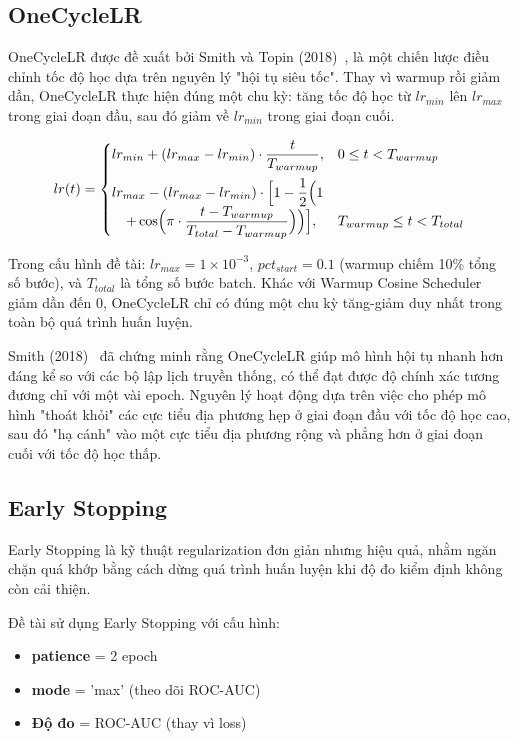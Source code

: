 \documentclass[../BTL.tex]{subfiles}
\begin{document}
\subsection{OneCycleLR}
OneCycleLR được đề xuất bởi Smith và Topin (2018)~\cite{smith2018superconvergence}, là một chiến lược điều chỉnh tốc độ học dựa trên nguyên lý "hội tụ siêu tốc". Thay vì warmup rồi giảm dần, OneCycleLR thực hiện đúng một chu kỳ: tăng tốc độ học từ $lr_{min}$ lên $lr_{max}$ trong giai đoạn đầu, sau đó giảm về $lr_{min}$ trong giai đoạn cuối.

\begin{equation}
    lr(t) =
    \begin{cases}
        lr_{min} + (lr_{max} - lr_{min}) \cdot \dfrac{t}{T_{warmup}}, & 0 \leq t < T_{warmup} \\[1em]
        lr_{max} - (lr_{max} - lr_{min}) \cdot \Bigl[1 - \dfrac{1}{2}\Bigl(1 & \\
        \quad + \cos\Bigl(\pi \cdot \dfrac{t - T_{warmup}}{T_{total} - T_{warmup}}\Bigr)\Bigr)\Bigr], & T_{warmup} \leq t < T_{total}
    \end{cases}
\end{equation}

Trong cấu hình đề tài: $lr_{max} = 1 \times 10^{-3}$, $pct_{start} = 0.1$ (warmup chiếm 10\% tổng số bước), và $T_{total}$ là tổng số bước batch. Khác với Warmup Cosine Scheduler giảm dần đến 0, OneCycleLR chỉ có đúng một chu kỳ tăng-giảm duy nhất trong toàn bộ quá trình huấn luyện.

Smith (2018)~\cite{smith2018superconvergence} đã chứng minh rằng OneCycleLR giúp mô hình hội tụ nhanh hơn đáng kể so với các bộ lập lịch truyền thống, có thể đạt được độ chính xác tương đương chỉ với một vài epoch. Nguyên lý hoạt động dựa trên việc cho phép mô hình "thoát khỏi" các cực tiểu địa phương hẹp ở giai đoạn đầu với tốc độ học cao, sau đó "hạ cánh" vào một cực tiểu địa phương rộng và phẳng hơn ở giai đoạn cuối với tốc độ học thấp.

\subsection{Early Stopping}
Early Stopping là kỹ thuật regularization đơn giản nhưng hiệu quả, nhằm ngăn chặn quá khớp bằng cách dừng quá trình huấn luyện khi độ đo kiểm định không còn cải thiện.

Đề tài sử dụng Early Stopping với cấu hình:
\begin{itemize}
    \item \textbf{patience} = 2 epoch
    \item \textbf{mode} = 'max' (theo dõi ROC-AUC)
    \item \textbf{Độ đo} = ROC-AUC (thay vì loss)
\end{itemize}
\end{document}
